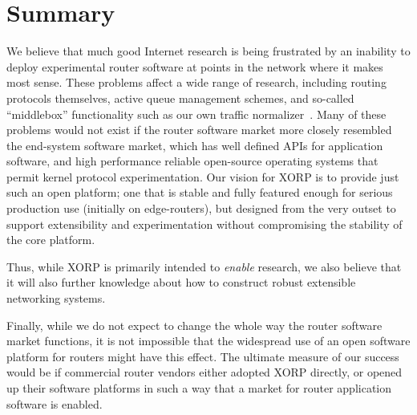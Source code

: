 
\section{Summary}

We believe that much good Internet research is being frustrated by an
inability to deploy experimental router software at points in the
network where it makes most sense.  These problems affect a wide range
of research, including routing protocols themselves, active queue
management schemes, and so-called ``middlebox'' functionality such as
our own traffic normalizer~\cite{norm}.  Many of these problems would
not exist if the router software market more closely resembled the
end-system software market, which has well defined APIs for
application software, and high performance reliable open-source
operating systems that permit kernel protocol experimentation.  Our
vision for XORP is to provide just such an open
platform; one that is stable and fully featured enough for serious
production use (initially on edge-routers), but designed from the very
outset to support extensibility and experimentation without
compromising the stability of the core platform.

Thus, while XORP is primarily intended to {\em enable} research, we
also believe that it will also further knowledge about how to
construct robust extensible networking systems.

Finally, while we do not expect to change the whole way the router
software market functions, it is not impossible that the widespread
use of an open software platform for routers might have this effect.
The ultimate measure of our success would be if commercial router
vendors either adopted XORP directly, or opened up their software
platforms in such a way that a market for router application software
is enabled.
